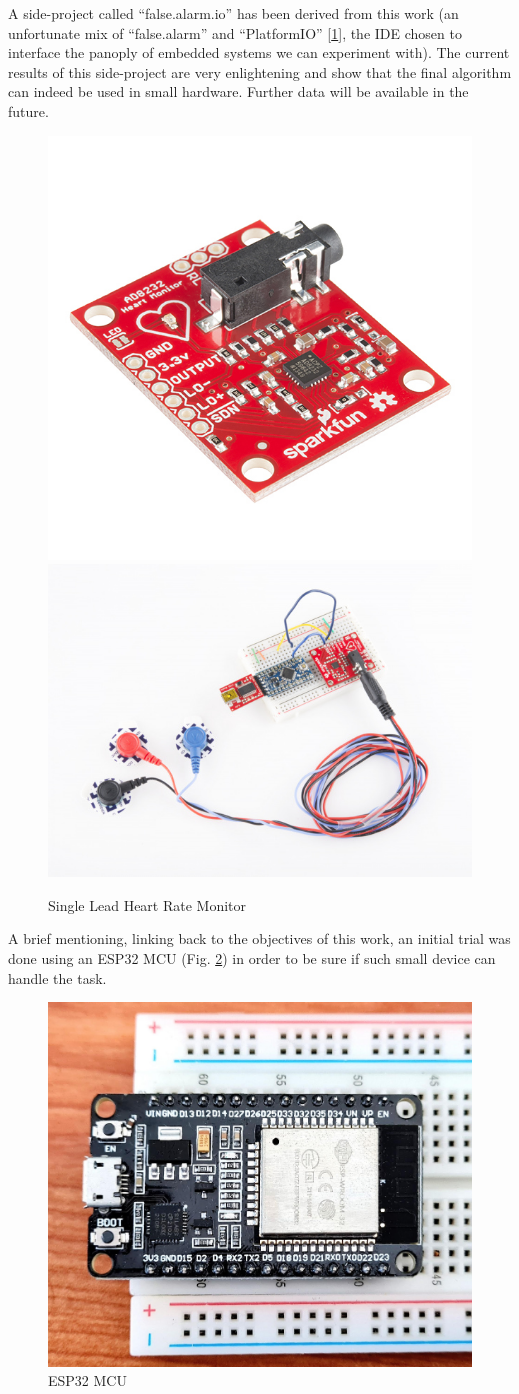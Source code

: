\documentclass[runningheads]{llncs}
\begin{document}
A side-project called ``false.alarm.io'' has been derived from this work (an unfortunate mix of
``false.alarm'' and ``PlatformIO'' {[}\protect\hyperlink{ref-PlatformIO}{1}{]}, the IDE chosen to interface the panoply of embedded
systems we can experiment with). The current results of this side-project are very enlightening and
show that the final algorithm can indeed be used in small hardware. Further data will be available
in the future.

\begin{figure}

{\centering \includegraphics[width=0.4\linewidth]{../../docs/figure/sparkfun} \includegraphics[width=0.4\linewidth]{../../docs/figure/FullSetup} 

}

\caption{Single Lead Heart Rate Monitor}\label{fig:ad8232}
\end{figure}

A brief mentioning, linking back to the objectives of this work, an initial trial was done using an
ESP32 MCU (Fig. \ref{fig:esp32}) in order to be sure if such small device can handle the task.

\begin{figure}

{\centering \includegraphics[width=0.5\linewidth]{../../docs/figure/esp32} 

}

\caption{ESP32 MCU}\label{fig:esp32}
\end{figure}
\end{document}
